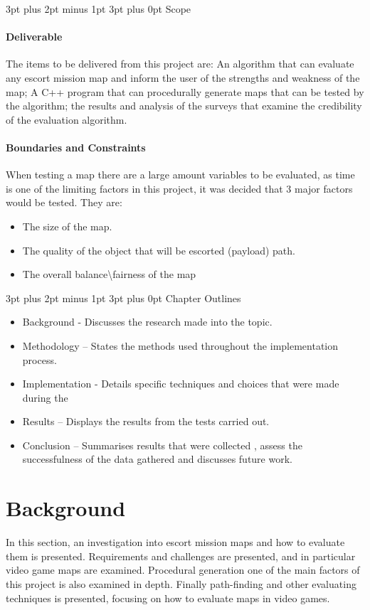 \documentclass[12pt,a4paper,oneside]{book}
\makeatletter
\renewcommand\subsection{\@startsection {subsection}{1}{2mm} %
                               {3pt plus 2pt minus 1pt} %
                               {3pt plus 0pt} %
                               {\normalfont\bfseries}}
\makeatother
\begin{document}
\subsection{Scope}
\subsubsection{Deliverable}
The items to be delivered from this project are: An algorithm that can evaluate any escort mission map and inform the user of the strengths and weakness of the map; A C++ program that can procedurally generate maps that can be tested by the algorithm; the results and analysis of the surveys that examine the credibility of the evaluation algorithm.  
\subsubsection{Boundaries and Constraints}
When testing a map there are a large amount variables to be evaluated, as time is one of the limiting factors in this project, it was decided that 3 major factors would be tested. They are:
\begin{itemize}
	\item The size of the map.
	\item The quality of the object that will be escorted (payload) path.
	\item The overall balance\textbackslash fairness of the map 	
\end{itemize}
\subsection{Chapter Outlines}
\begin{itemize}
	\item Background - Discusses the research made into the topic.
	\item Methodology – States the methods used throughout the implementation process.
	\item Implementation - Details specific techniques and choices that were made during the 
	\item Results – Displays the results from the tests carried out.
	\item Conclusion – Summarises results that were collected , assess the successfulness of the data gathered and discusses future work.	
\end{itemize}

\chapter{Background}
In this section, an investigation into escort mission maps and how to evaluate them is presented. Requirements and challenges are presented, and in particular video game maps are examined. Procedural generation one of the main factors of this project is also examined in depth. Finally path-finding and other evaluating techniques is presented, focusing on how to evaluate maps in video games. 
\end{document}
